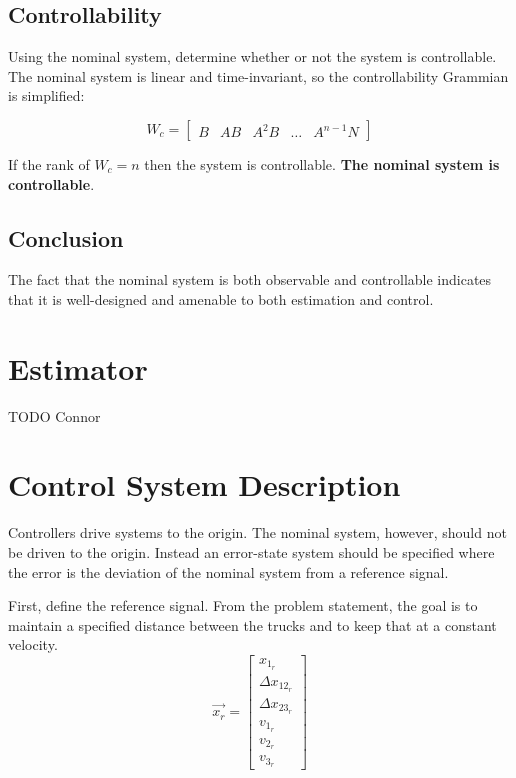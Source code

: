 \documentclass[12pt,onecolumn,reqno]{amsart}
\begin{document}
\subsection{Controllability}
Using the nominal system, determine whether or not the system is controllable. The
nominal system is linear and time-invariant, so the controllability Grammian is
simplified:

\begin{equation}
  W_{c} = 
  \begin{bmatrix}
    B & AB & A^2B & \hdots & A^{n-1}N
  \end{bmatrix}
\end{equation}

If the rank of $W_{c} = n$ then the system is controllable. \textbf{The nominal
system is controllable}.

\subsection{Conclusion}
The fact that the nominal system is both observable and controllable indicates
that it is well-designed and amenable to both estimation and control.


\section{Estimator}
TODO Connor

\section{Control System Description}
Controllers drive systems to the origin. The nominal system, however, should not
be driven to the origin. Instead an error-state system should be specified where
the error is the deviation of the nominal system from a reference signal.

First, define the reference signal. From the problem statement, the goal is to
maintain a specified distance between the trucks and to keep that at a constant
velocity.
\begin{equation}
  \vec{x_{r}} = 
  \begin{bmatrix}
    x_{1_{r}}         \\
    \Delta x_{12_{r}} \\
    \Delta x_{23_{r}} \\
    v_{1_{r}}         \\
    v_{2_{r}}         \\
    v_{3_{r}}
  \end{bmatrix}
\end{equation}
\end{document}
